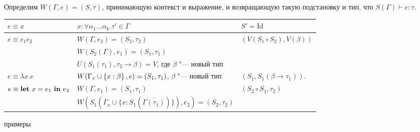 Определим $W(\Gamma, e) = (S, \tau)$, принимающую контекст и выражение, и возвращающую такую подстановку и тип,
что $S(\Gamma) \vdash e : \tau$.
\begin{center}
\begin{tabular}{l l l} \toprule
    $e \equiv x$
        & $x : \forall \alpha_1 \ldots \alpha_k . \tau' \in \Gamma$
        & $S'=\mathrm{Id}$ \\ \midrule
    $e \equiv e_1 e_2$
            & $W(\Gamma, e_2) = (S_2, \tau_2)$ & $(V(S_1 \circ S_2), V(\beta))$ \\ \addlinespace[0.6ex]
            & $W(S_2(\Gamma), e_1) = (S_1, \tau_1)$ & \\ \addlinespace[0.6ex]
            & $U(S_1(\tau_1), \tau_2 \rightarrow \beta) = V$, где $\beta$ "--- новый тип & \\ \midrule
    $e\equiv\lambda x . e$
        & $W(\Gamma_x \cup \left\{x : \beta\right\}, e) = (S_1, \tau_1)$, $\beta$ "--- новый тип
        & $(S_1, S_1(\beta \rightarrow \tau_1))$. \\ \midrule
    $e\equiv\text{\textbf{let}}~x=e_1~\text{\textbf{in}}~e_2$
        & $W(\Gamma, e_1) = (S_1, \tau_1)$ & $(S_2 \circ S_1, \tau_2)$ \\ \addlinespace[0.6ex]
        & $W(S_1(\Gamma_x \cup \{x : S_1(\overline{\Gamma(\tau_1)})\}), e_2) = (S_2, \tau_2)$ & \\ \bottomrule
\end{tabular}
\end{center}
\todo примеры
